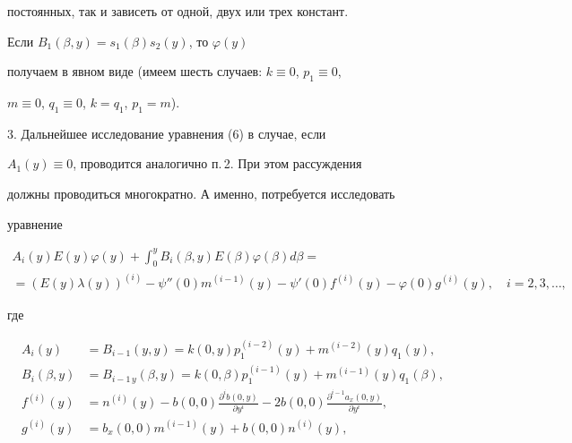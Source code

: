 постоянных, так и зависеть от одной, двух или трех констант.





Если $B_{1}(\beta,y)=s_{1}(\beta)s_{2}(y)$, то $\varphi(y)$


получаем в явном виде (имеем шесть случаев: $k\equiv0$, $p_{1}\equiv0$,


$m\equiv0$, $q_{1}\equiv0$, $k=q_{1}$, $p_{1}=m$).


\medskip





3. Дальнейшее исследование уравнения (6) в случае, если


$A_{1}(y)\equiv0$, проводится аналогично п.\,2. При этом рассуждения


должны проводиться многократно. А именно, потребуется исследовать


уравнение


\begin{multline}


A_{i}(y)E(y)\varphi(y)+\int_{0}^{y} B_{i}(\beta,y)


E(\beta)\varphi(\beta) d\beta = \\


=(E(y)\lambda(y))^{(i)}-


\psi''(0)m^{(i-1)}(y) - \psi'(0)f^{(i)}(y) - \varphi(0)g^{(i)}(y),


\quad i=2,3, \dotsc,


\end{multline}


где


\begin{align*}


A_{i}(y)&=B_{i-1}(y,y)=k(0,y)p_{1}^{(i-2)}(y)+m^{(i-2)}(y)q_{1}(y),\\


%


B_{i}(\beta,y)&=B_{i-1\, y}(\beta,y)=k(0,\beta)p_{1}^{(i-1)}(y)+


m^{(i-1)}(y)q_{1}(\beta), \\


%


f^{(i)}(y)&=n^{(i)}(y)-b(0,0)\frac{\partial^{i} b(0,y)}{\partial


y^{i}}-2b(0,0)\frac{\partial^{i-1}a_{x}(0,y)}{\partial y^{i}}, \\


%


g^{(i)}(y)&=b_{x}(0,0)m^{(i-1)}(y)+b(0,0)n^{(i)}(y),


\end{align*}


